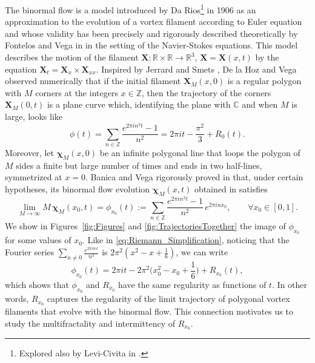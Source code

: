 \documentclass[11pt,reqno]{amsart}
\theoremstyle{definition}
\begin{document}
The binormal flow is a model introduced by Da Rios\footnote{
Explored also by Levi-Civita in \cite{LeviCivita1932}.
} 
in 1906 \cite{DaRios1906} as an approximation to the evolution of a vortex filament according to Euler equation
and whose validity has been precisely and rigorously described theoretically by Fontelos and Vega in \cite{FontelosVega2023}
 in the setting of the Navier-Stokes equations.
This model describes the motion of the filament $\boldsymbol{X}: \mathbb R \times \mathbb R \to \mathbb R^3$, $\boldsymbol{X} = \boldsymbol{X}(x,t)$ by the equation $\boldsymbol{X}_t = \boldsymbol{X}_x \times \boldsymbol{X}_{xx}$. 
Inspired by Jerrard and Smets \cite{JerrardSmets2015},
De la Hoz and Vega \cite{DelaHozVega2014} observed numerically that
if the initial filament 
$\boldsymbol{X}_M(x,0)$ 
is a regular polygon with $M$ corners at the integers $x \in \mathbb Z$, 
then the trajectory of the corners 
$\boldsymbol{X}_M(0,t)$ 
is a plane curve which, identifying the plane with $\mathbb C$ and when $M$ is large, looks like
\begin{equation}\label{eq:Riemann_Simplification}
\phi(t) = \sum_{n \in \mathbb Z} \frac{e^{2\pi i n^2 t} - 1}{n^2} = 2\pi it - \frac{\pi^2}{3} + R_0(t).
\end{equation}
Moreover, 
let $\boldsymbol{\chi}_M(x,0)$ be an infinite polygonal line that loops the polygon of $M$ sides a finite but large number of times and ends in two half-lines, symmetrized at $x=0$.
Banica and Vega rigorously proved in \cite{BanicaVega2022} that, under certain hypotheses, its binormal flow evolution $\boldsymbol{\chi}_M(x,t)$ obtained in \cite{BanicaVega2020} satisfies 
\begin{equation}\label{eq:Phi_x0_Definition}
\lim_{M \to \infty} M \, \boldsymbol{\chi}_M(x_0,t) 
= \phi_{x_0}(t) 
:= \sum_{n \in \mathbb Z} \frac{e^{2 \pi i n^2 t} - 1}{n^2} \, e^{2\pi i n x_0}, \qquad \forall x_0 \in [0,1].
\end{equation}
We show in Figures~\ref{fig:Figures} and \ref{fig:TrajectoriesTogether} 
the image of $\phi_{x_0}$ for some values of $x_0$. 
Like in \eqref{eq:Riemann_Simplification}, 
noticing that the Fourier series $\displaystyle{\sum_{n \neq 0} \frac{ e^{2\pi i n x} }{n^2}}$ is $2\pi^2 \left(x^2 - x + \frac16 \right)$,
we can write
\begin{equation}
\phi_{x_0}(t) =2\pi i t - 2 \pi^2 \Big(x_0^2 - x_0  + \frac{1}{6}\Big) + R_{x_0}(t), 
\end{equation} 
which shows that $\phi_{x_0}$ and $R_{x_0}$ have the same regularity as functions of $t$. 
In other words, 
$R_{x_0}$ captures the regularity of the limit trajectory of polygonal vortex filaments 
that evolve with the binormal flow. 
This connection motivates us to study the multifractality and intermittency of $R_{x_0}$. 
\end{document}
